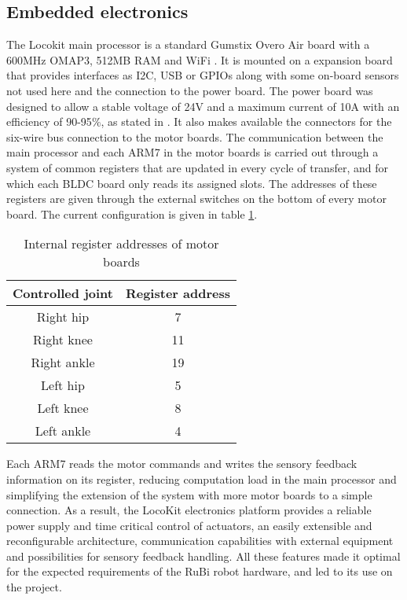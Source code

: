 
\subsection{Embedded electronics} %
\label{sub:locokit_electronics}
The Locokit main processor is a standard Gumstix Overo Air board with a 600MHz OMAP3, 512MB RAM and WiFi \cite{gumstix}.
It is mounted on a expansion board that provides interfaces as I2C, USB or GPIOs along with some on-board sensors not used here and the connection to the power board.
The power board was designed to allow a stable voltage of 24V and a maximum current of 10A with an efficiency of 90-95$\%$, as stated in \cite{locokit-electronics}.
It also makes available the connectors for the six-wire bus connection to the motor boards.
The communication between the main processor and each ARM7 in the motor boards is carried out through a system of common registers that are updated in every cycle of transfer, and for which each BLDC board only reads its assigned slots.
The addresses of these registers are given through the external switches on the bottom of every motor board.
The current configuration is given in table \ref{tab:motor_boards_addresses}.

\begin{table}
\begin{center}
\begin{tabular}{c | c}
  Controlled joint & Register address \\
  \hline
  Right hip & 7 \\
  Right knee & 11 \\
  Right ankle & 19 \\
  Left hip & 5 \\
  Left knee & 8\\
  Left ankle & 4 
\end{tabular}
\caption{Internal register addresses of motor boards}
\label{tab:motor_boards_addresses}
\end{center}
\end{table}

Each ARM7 reads the motor commands and writes the sensory feedback information on its register, reducing computation load in the main processor and simplifying the extension of the system with more motor boards to a simple connection.
As a result, the LocoKit electronics platform provides a reliable power supply and time critical control of actuators, an easily extensible and reconfigurable architecture, communication capabilities with external equipment and possibilities for sensory feedback handling.
All these features made it optimal for the expected requirements of the RuBi robot hardware, and led to its use on the project. 



